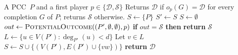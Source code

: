 \documentclass[a4paper,11pt,oneside]{scrartcl}
\theoremstyle{definition}
\theoremstyle{remark}
\newcommand{\pcc}{PCC}
\newcommand{\unsure}{\texttt{Unsure}}
\begin{document}
\begin{algorithm}[H]
    \caption{\textsc{CompletionOutcome}$(P, p)$}
    \label{algorithm:completion_outcome}
    \begin{algorithmic}[1]
        \REQUIRE A \pcc\ $P$ and a first player $p \in \{\mathcal D, \mathcal S\}$
        \ENSURE Returns $\mathcal D$ if $o_p(G) = \mathcal D$ for every completion $G$ of $P$; returns $\mathcal S$ otherwise.
        \STATE $S \gets \{P\}$ \label{algorithm_line:compl_out_while_loop}
            \STATE $S' \gets S$
            \STATE $S \gets \emptyset$
             \label{algorithm_line:compl_out_for_loop}
                \STATE $out \gets \textsc{PotentialOutcome}((P', \emptyset, \emptyset), p)$ \label{algorithm_line:compl_out_potout_call}
                \STATE \textbf{if} $out = \mathcal S$ \textbf{then} \textbf{return} $\mathcal S$ \label{algorithm_line:compl_out_return_S}
                \IF{$out = \unsure$}
                    \STATE $L \gets \{u \in V(P') : \deg_{P'}(u) < d\}$
                    \STATE Let $v \in L$ \label{algorithm_line:compl_out_pick_low_deg_vtx}
                     \label{algorithm_line:compl_out_for_loop_over_potlow_deg_neigh}
                        \STATE $S \gets S \cup \big\{(V(P'), E(P') \cup \{vw\})\big\}$ \label{algorithm_line:compl_out_add_new_compl_to_S}
                    \ENDFOR
                \ENDIF
            \ENDFOR
        \ENDWHILE
        \STATE \textbf{return} $\mathcal D$ \label{algorithm_line:compl_out_return_D}
    \end{algorithmic}
\end{algorithm}
\end{document}
